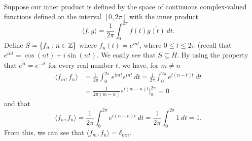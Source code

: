 \begin{eg}
    Suppose our inner product is defined by the space of continuous complex-valued functions defined on the interval \( [0, 2 \pi] \) with the inner product
    \[  \langle f , g \rangle = \frac{ 1 }{ 2 \pi  }  \int_{ 0 }^{ 2 \pi  } f(t) \overline{g(t)} \ dt. \]
    Define \( S = \{ {f}_{n} : n \in \mathbb{Z}  \}  \) where \( {f}_{n}(t) = e^{i n t} \), where \( 0 \leq t \leq 2 \pi \) (recall that \( e^{i n t } = \cos(nt) + i \sin(nt) \). We easily see that \( S \subseteq H   \). By using the property that \( \overline{e^{it  }} = e^{-it  } \) for every real number \( t  \), we have, for \( m \neq n  \)
    \begin{align*}
        \langle {f}_{m}  , {f}_{n} \rangle &= \frac{ 1 }{ 2 \pi  } \int_{ 0  }^{  2 \pi  } e^{imt} e^{\overline{i n t }}  \ dt = \frac{ 1 }{ 2 \pi  }  \int_{ 0 }^{ 2 \pi  } e^{i (n-t) t } \ dt \\
                                           &= \frac{ 1 }{ 2 \pi (m-n) }  e^{i (m-n) t } \Big|_{0}^{2\pi} = 0
    \end{align*}
    and that 
    \[  \langle {f}_{n} , {f}_{n} \rangle = \frac{ 1 }{ 2 \pi  }  \int_{ 0 }^{ 2 \pi } e^{i(n-n)t}  \ dt = \frac{ 1 }{ 2\pi } \int_{ 0 }^{ 2 \pi  }  1  \ dt = 1. \]
    From this, we can see that \( \langle {f}_{m} , {f}_{n} \rangle =  {\delta}_{mn} \).
\end{eg}
